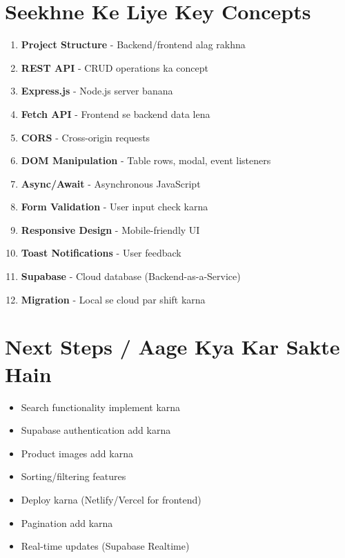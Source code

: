 \documentclass[12pt,a4paper]{article}
\begin{document}
\section{Seekhne Ke Liye Key Concepts}
\label{sec:learn}

\begin{enumerate}[leftmargin=2em]
    \item \textbf{Project Structure} - Backend/frontend alag rakhna
    \item \textbf{REST API} - CRUD operations ka concept
    \item \textbf{Express.js} - Node.js server banana
    \item \textbf{Fetch API} - Frontend se backend data lena
    \item \textbf{CORS} - Cross-origin requests
    \item \textbf{DOM Manipulation} - Table rows, modal, event listeners
    \item \textbf{Async/Await} - Asynchronous JavaScript
    \item \textbf{Form Validation} - User input check karna
    \item \textbf{Responsive Design} - Mobile-friendly UI
    \item \textbf{Toast Notifications} - User feedback
    \item \textbf{Supabase} - Cloud database (Backend-as-a-Service)
    \item \textbf{Migration} - Local se cloud par shift karna
\end{enumerate}

\section{Next Steps / Aage Kya Kar Sakte Hain}
\label{sec:next}

\begin{itemize}[leftmargin=2em]
    \item Search functionality implement karna
    \item Supabase authentication add karna
    \item Product images add karna
    \item Sorting/filtering features
    \item Deploy karna (Netlify/Vercel for frontend)
    \item Pagination add karna
    \item Real-time updates (Supabase Realtime)
\end{itemize}
\end{document}
